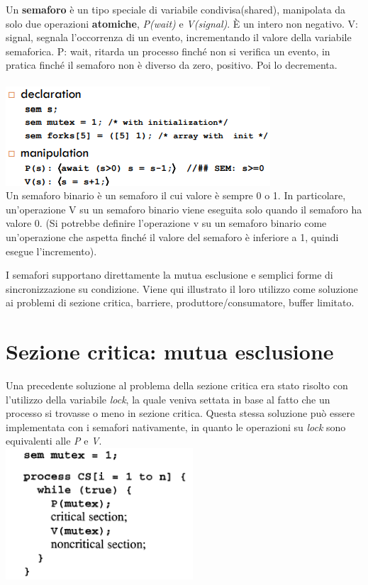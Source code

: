 \documentclass[10pt,a4paper]{book}
\begin{document}
Un \textbf{semaforo} è un tipo speciale di variabile condivisa(shared), manipolata da solo due operazioni \textbf{atomiche}, \textit{P(wait)} e \textit{V(signal)}.
\`{E} un intero non negativo.
V: signal, segnala l'occorrenza di un evento, incrementando il valore della variabile semaforica.
P: wait, ritarda un processo finché non si verifica un evento, in pratica finché il semaforo non è diverso da zero, positivo. Poi lo decrementa.\\ \\
\includegraphics[scale=0.7]{img/sem.png} \\

Un semaforo binario è un semaforo il cui valore è sempre 0 o 1. In particolare, un'operazione V su un semaforo binario viene eseguita solo quando il semaforo ha valore 0. (Si potrebbe definire l'operazione v su un semaforo binario come un'operazione che aspetta finché il valore del semaforo è inferiore a 1, quindi esegue l'incremento).

I semafori supportano direttamente la mutua esclusione e semplici forme di sincronizzazione su condizione.
Viene qui illustrato il loro utilizzo come soluzione ai problemi di sezione critica, barriere, produttore/consumatore, buffer limitato.

\section{Sezione critica: mutua esclusione}
Una precedente soluzione al problema della sezione critica era stato risolto con l'utilizzo della variabile \textit{lock}, la quale veniva settata in base al fatto che un processo si trovasse o meno in sezione critica.
Questa stessa soluzione può essere implementata con i semafori nativamente, in quanto le operazioni su \textit{lock} sono equivalenti alle \textit{P} e \textit{V}.\\
\includegraphics[scale=0.7]{img/sem1.png} \\
\end{document}
